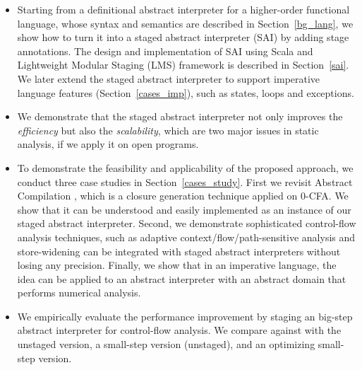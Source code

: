 \begin{itemize}
\item Starting from a definitional abstract interpreter for a higher-order functional language,
  whose syntax and semantics are described in Section~\ref{bg_lang},
  we show how to turn it into a staged abstract interpreter (SAI) by adding stage annotations. 
  The design and implementation of SAI using Scala and Lightweight Modular Staging (LMS) framework is 
  described in Section~\ref{sai}.
  We later extend the staged abstract interpreter to support imperative language features 
  (Section~\ref{cases_imp}), such as states, loops and exceptions.
\item We demonstrate that the staged abstract interpreter not only improves the \textit{efficiency}
  but also the \textit{scalability}, which are two major issues in static analysis, if we apply it on open
  programs. 
\item To demonstrate the feasibility and applicability of the proposed approach, we conduct three case studies in Section~\ref{cases_study}. 
  First we revisit Abstract Compilation \cite{Boucher:1996:ACN:647473.727587}, which is a closure generation 
  technique applied on 0-CFA. We show that it can be understood and easily implemented as an instance of 
  our staged abstract interpreter. 
  Second, we demonstrate sophisticated control-flow analysis techniques, such as adaptive context/flow/path-sensitive 
  analysis and store-widening can be integrated with staged abstract interpreters without losing any precision.
  Finally, we show that in an imperative language, the idea can be applied to an abstract interpreter with
  an abstract domain that performs numerical analysis.
\item We empirically evaluate the performance improvement by staging an big-step abstract interpreter 
  for control-flow analysis. We compare against with the unstaged version, a small-step version (unstaged), 
  and an optimizing small-step version.
\end{itemize}
